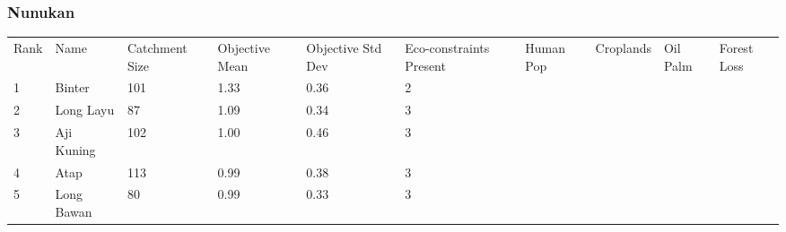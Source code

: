 \subsubsection{Nunukan}
\begin{table}[ht]
\centering
\begingroup\fontsize{8pt}{9pt}\selectfont
\begin{tabular}{C{0.03\textwidth}C{0.12\textwidth}C{0.09\textwidth}C{0.08\textwidth}C{0.08\textwidth}C{0.08\textwidth}C{0.07\textwidth}C{0.07\textwidth}C{0.07\textwidth}C{0.07\textwidth}}
 Rank & Name & Catchment Size & Objective Mean & Objective Std Dev & Eco-constraints  Present & Human Pop & Croplands & Oil Palm & Forest Loss \\ 
 {1} & Binter & 101 & \textcolor[HTML]{FFFFFF}{1.33} & \textcolor[HTML]{000000}{0.36} & \textcolor[HTML]{000000}{2} &  &  &  &  \\ 
  {2} & Long Layu &  87 & \textcolor[HTML]{FFFFFF}{1.09} & \textcolor[HTML]{000000}{0.34} & \textcolor[HTML]{000000}{3} &  &  &  &  \\ 
  {3} & Aji Kuning & 102 & \textcolor[HTML]{000000}{1.00} & \textcolor[HTML]{FFFFFF}{0.46} & \textcolor[HTML]{000000}{3} &  &  &  &  \\ 
  {4} & Atap & 113 & \textcolor[HTML]{000000}{0.99} & \textcolor[HTML]{FFFFFF}{0.38} & \textcolor[HTML]{000000}{3} &  &  &  &  \\ 
  {5} & Long Bawan &  80 & \textcolor[HTML]{000000}{0.99} & \textcolor[HTML]{000000}{0.33} & \textcolor[HTML]{000000}{3} &  &  &  &  \\ 

\end{tabular}
\end{table}

